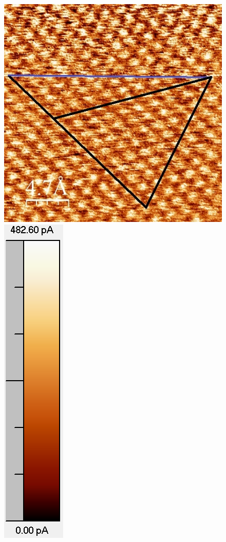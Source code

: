\documentclass[12pt,a4paper]{article}
\begin{document}
\begin{figure}[H]
\centering
\includegraphics[scale=0.6]{Bilder/Atome/hoch2_h.jpg}
\includegraphics[scale=0.59]{Bilder/Atome/hoch2_scale.png}

\end{figure}
\end{document}
